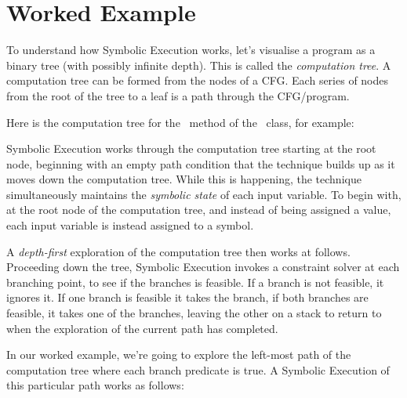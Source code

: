 \section{Worked Example}

To understand how Symbolic Execution works, let's visualise a program as a
binary tree (with possibly infinite depth). This is called the {\it computation
tree}. A computation tree can be formed from the nodes of a CFG. Each series of
nodes from the root of the tree to a leaf is a path through the CFG/program.

Here is the computation tree for the \classifymethod~method of the
\triangleclass~class, for example:


Symbolic Execution works through the computation tree starting at the root node,
beginning with an empty path condition that the technique builds up as it moves
down the computation tree. While this is happening, the technique simultaneously
maintains the {\it symbolic state} of each input variable. To begin with, at the
root node of the computation tree, and instead of being assigned a value, each
input variable is instead assigned to a symbol. 

A {\it depth-first} exploration of the computation tree then works at follows.
Proceeding down the tree, Symbolic Execution invokes a constraint solver at each
branching point, to see if the branches is feasible. If a branch is not
feasible, it ignores it. If one branch is feasible it takes the branch, if both
branches are feasible, it takes one of the branches, leaving the other on a
stack to return to when the exploration of the current path has completed. 

In our worked example, we're going to explore the left-most path of the
computation tree where each branch predicate is true. A Symbolic Execution of
this particular path works as follows:

